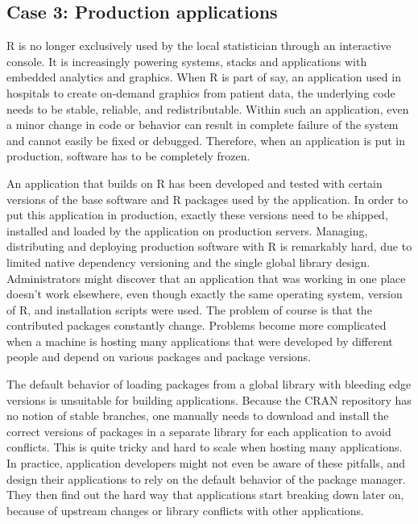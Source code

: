 \subsection{Case 3: Production applications}

R is no longer exclusively used by the local statistician through an
interactive console. It is increasingly powering systems, stacks and
applications with embedded analytics and graphics. When R is part of say, an
application used in hospitals to create on-demand graphics from patient data,
the underlying code needs to be stable, reliable, and redistributable. Within
such an application, even a minor change in code or behavior can result in
complete failure of the system and cannot easily be fixed or debugged.
Therefore, when an application is put in production, software has to be
completely frozen.

An application that builds on R has been developed and tested with certain
versions of the base software and R packages used by the application. In order
to put this application in production, exactly these versions need to be shipped,
installed and loaded by the application on production servers. Managing,
distributing and deploying production software with R is remarkably hard, due
to limited native dependency versioning and the single global library design.
Administrators might discover that an application that was working in one
place doesn't work elsewhere, even though exactly the same operating system,
version of R, and installation scripts were used. The problem of course is that
the contributed packages constantly change. Problems become more complicated
when a machine is hosting many applications that were developed by different
people and depend on various packages and package versions.

The default behavior of loading packages from a global library with bleeding
edge versions is unsuitable for building applications. Because the CRAN
repository has no notion of stable branches, one manually needs to download and
install the correct versions of packages in a separate library for each
application to avoid conflicts. This is quite tricky and hard to scale when
hosting many applications. In practice, application developers might not even be
aware of these pitfalls, and design their applications to rely on the default
behavior of the package manager. They then find out the hard way that
applications start breaking down later on, because of upstream changes or
library conflicts with other applications.

